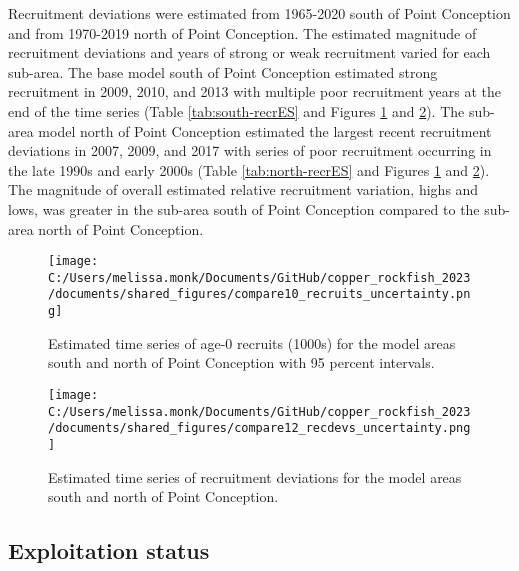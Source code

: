 \documentclass[11pt,
  letterpaper,
]{article}
\begin{document}
Recruitment deviations were estimated from 1965-2020 south of Point Conception and from 1970-2019 north of Point Conception. The estimated magnitude of recruitment deviations and years of strong or weak recruitment varied for each sub-area. The base model south of Point Conception estimated strong recruitment in 2009, 2010, and 2013 with multiple poor recruitment years at the end of the time series (Table \ref{tab:south-recrES} and Figures \ref{fig:es-recruits} and \ref{fig:es-rec-devs}). The sub-area model north of Point Conception estimated the largest recent recruitment deviations in 2007, 2009, and 2017 with series of poor recruitment occurring in the late 1990s and early 2000s (Table \ref{tab:north-recrES} and Figures \ref{fig:es-recruits} and \ref{fig:es-rec-devs}). The magnitude of overall estimated relative recruitment variation, highs and lows, was greater in the sub-area south of Point Conception compared to the sub-area north of Point Conception.



\newpage



\begin{figure}
{\centering
\texttt{[image: C:/Users/melissa.monk/Documents/GitHub/copper\_rockfish\_2023/documents/shared\_figures/compare10\_recruits\_uncertainty.png]}
}
\caption{Estimated time series of age-0 recruits (1000s) for the model areas south and north of Point Conception with 95 percent intervals.\label{fig:es-recruits}}
\end{figure}

\begin{figure}
{\centering
\texttt{[image: C:/Users/melissa.monk/Documents/GitHub/copper\_rockfish\_2023/documents/shared\_figures/compare12\_recdevs\_uncertainty.png]}
}
\caption{Estimated time series of recruitment deviations for the model areas south and north of Point Conception.\label{fig:es-rec-devs}}
\end{figure}

\clearpage

\subsection*{Exploitation status}\label{exploitation-status}
\end{document}

